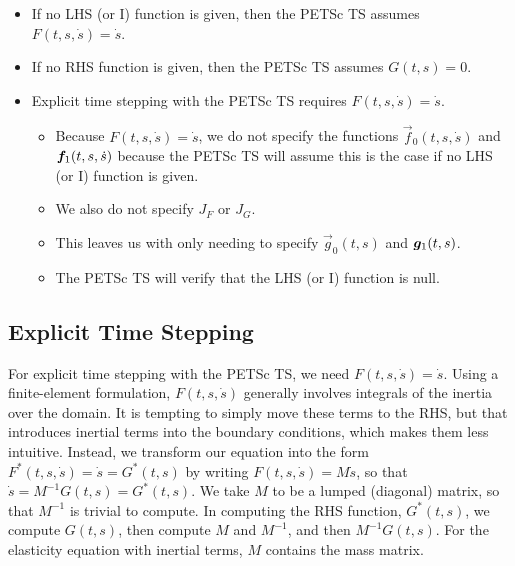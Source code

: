 \begin{itemize}
\item If no LHS (or I) function is given, then the PETSc TS assumes $F(t,s,\dot{s}) = \dot{s}
$.
\item If no RHS function is given, then the PETSc TS assumes $G(t,s) = 0$.
\item Explicit time stepping with the PETSc TS requires
  $F(t,s,\dot{s}) = \dot{s}$.
  \begin{itemize}
  \item Because $F(t,s,\dot{s}) = \dot{s}$, we do not specify the
    functions $\vec{f}_0(t,s,\dot{s})$ and $\bm{f}_1(t,s,\dot{s})$
    because the PETSc TS will assume this is the case if no LHS (or I)
    function is given.
  \item We also do not specify $J_F$ or $J_G$.
  \item This leaves us with only needing to specify $\vec{g}_0(t,s)$
    and $\bm{g}_1(t,s)$.
  \item The PETSc TS will verify that the LHS (or I) function is null.
  \end{itemize}
\end{itemize}

\subsection{Explicit Time Stepping}

For explicit time stepping with the PETSc TS, we need $F(t,s,\dot{s})
= \dot{s}$. Using a finite-element formulation, $F(t,s,\dot{s})$
generally involves integrals of the inertia over the domain. It is
tempting to simply move these terms to the RHS, but that introduces
inertial terms into the boundary conditions, which makes them less
intuitive. Instead, we transform our equation into the form
$F^*(t,s,\dot{s}) = \dot{s} = G^*(t,s)$ by writing $F(t,s,\dot{s}) = M
\dot{s}$, so that $\dot{s} = M^{-1} G(t,s) = G^*(t,s)$. We take $M$ to
be a lumped (diagonal) matrix, so that $M^{-1}$ is trivial to
compute. In computing the RHS function, $G^*(t,s)$, we compute
$G(t,s)$, then compute $M$ and $M^{-1}$, and then $M^{-1}G(t,s)$. For
the elasticity equation with inertial terms, $M$ contains the mass
matrix.




